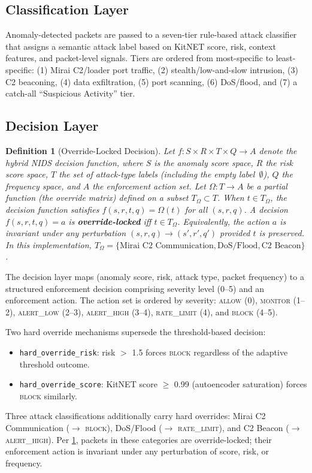 \documentclass[preprint,12pt,authoryear]{elsarticle}
\newtheorem{definition}{Definition}
\begin{document}
\subsection{Classification Layer}
\label{subsec:classification}

Anomaly-detected packets are passed to a seven-tier rule-based attack classifier
that assigns a semantic attack label based on KitNET score, risk, context
features, and packet-level signals. Tiers are ordered from most-specific to
least-specific: (1) Mirai C2/loader port traffic, (2) stealth/low-and-slow
intrusion, (3) C2 beaconing, (4) data exfiltration, (5) port scanning, (6)
DoS/flood, and (7) a catch-all ``Suspicious Activity'' tier.

\subsection{Decision Layer}
\label{subsec:decision}

\begin{definition}[Override-Locked Decision]
\label{def:override_locked}
Let $f\colon S \times R \times T \times Q \to A$ denote the hybrid NIDS
decision function, where $S$ is the anomaly score space, $R$ the risk score
space, $T$ the set of attack-type labels (including the empty label~$\emptyset$),
$Q$ the frequency space, and $A$ the enforcement action set. Let
$\Omega\colon T \to A$ be a partial function (the \emph{override matrix})
defined on a subset $T_\Omega \subset T$. When $t \in T_\Omega$, the decision
function satisfies $f(s, r, t, q) = \Omega(t)$ for all $(s, r, q)$. A decision
$f(s, r, t, q) = a$ is \textbf{override-locked} iff $t \in T_\Omega$.
Equivalently, the action $a$ is invariant under any perturbation
$(s, r, q) \to (s', r', q')$ provided $t$ is preserved.
In this implementation, $T_\Omega = \{\text{Mirai C2 Communication},
\text{DoS/Flood}, \text{C2 Beacon}\}$.
\end{definition}

The decision layer maps (anomaly score, risk, attack type, packet frequency) to
a structured enforcement decision comprising severity level (0--5) and an
enforcement action. The action set is ordered by severity: \textsc{allow}
(0), \textsc{monitor} (1--2), \textsc{alert\_low} (2--3), \textsc{alert\_high}
(3--4), \textsc{rate\_limit} (4), and \textsc{block} (4--5).

Two hard override mechanisms supersede the threshold-based decision:
\begin{itemize}
\item \texttt{hard\_override\_risk}: risk $>$ 1.5 forces \textsc{block}
  regardless of the adaptive threshold outcome.
\item \texttt{hard\_override\_score}: KitNET score $\geq$ 0.99 (autoencoder
  saturation) forces \textsc{block} similarly.
\end{itemize}
Three attack classifications additionally carry hard overrides: Mirai C2
Communication ($\to$ \textsc{block}), DoS/Flood ($\to$ \textsc{rate\_limit}),
and C2 Beacon ($\to$ \textsc{alert\_high}).
Per \cref{def:override_locked}, packets in these categories are override-locked;
their enforcement action is invariant under any perturbation of score, risk, or
frequency.
\end{document}

